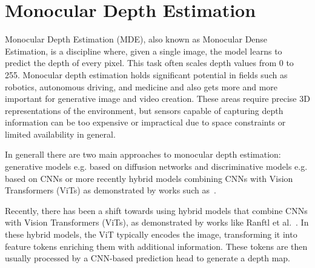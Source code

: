
\section{Monocular Depth Estimation}\label{sec:depth-estimation}

Monocular Depth Estimation (MDE), also known as Monocular Dense Estimation, is a discipline where, given a single image, the model learns to predict the depth of every pixel.
This task often scales depth values from 0 to 255. 
Monocular depth estimation holds significant potential in fields such as robotics, autonomous driving, and medicine and also gets more and more important for generative image and video creation. 
These areas require precise 3D representations of the environment, but sensors capable of capturing depth information can be too expensive or impractical due to space constraints or limited availability in general.

In generall there are two main approaches to monocular depth estimation: generative models e.g. based on diffusion networks and discriminative models e.g. based on CNNs or more recently hybrid models combining CNNs with Vision Transformers (ViTs) as demonstrated by works such as~\cite{Ranftl2021,Yang2024,Oquab2023}.

Recently, there has been a shift towards using hybrid models that combine CNNs with Vision Transformers (ViTs), as demonstrated by works like Ranftl et al.~\cite{Ranftl2021}. 
In these hybrid models, the ViT typically encodes the image, transforming it into feature tokens enriching them with additional information. 
These tokens are then usually processed by a CNN-based prediction head to generate a depth map.


